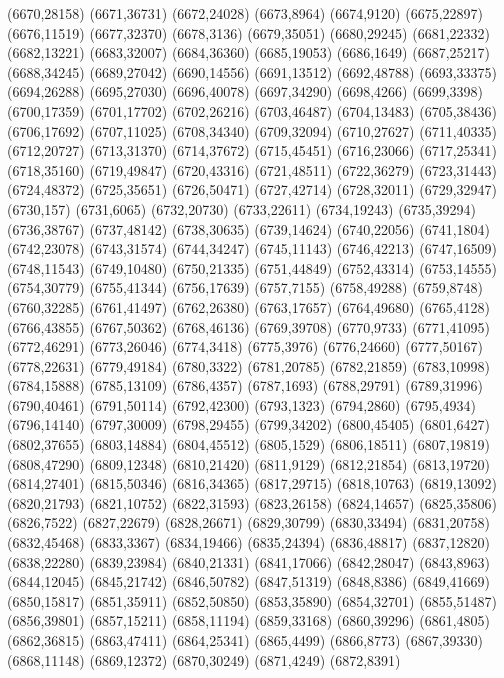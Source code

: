 (6670,28158)
(6671,36731)
(6672,24028)
(6673,8964)
(6674,9120)
(6675,22897)
(6676,11519)
(6677,32370)
(6678,3136)
(6679,35051)
(6680,29245)
(6681,22332)
(6682,13221)
(6683,32007)
(6684,36360)
(6685,19053)
(6686,1649)
(6687,25217)
(6688,34245)
(6689,27042)
(6690,14556)
(6691,13512)
(6692,48788)
(6693,33375)
(6694,26288)
(6695,27030)
(6696,40078)
(6697,34290)
(6698,4266)
(6699,3398)
(6700,17359)
(6701,17702)
(6702,26216)
(6703,46487)
(6704,13483)
(6705,38436)
(6706,17692)
(6707,11025)
(6708,34340)
(6709,32094)
(6710,27627)
(6711,40335)
(6712,20727)
(6713,31370)
(6714,37672)
(6715,45451)
(6716,23066)
(6717,25341)
(6718,35160)
(6719,49847)
(6720,43316)
(6721,48511)
(6722,36279)
(6723,31443)
(6724,48372)
(6725,35651)
(6726,50471)
(6727,42714)
(6728,32011)
(6729,32947)
(6730,157)
(6731,6065)
(6732,20730)
(6733,22611)
(6734,19243)
(6735,39294)
(6736,38767)
(6737,48142)
(6738,30635)
(6739,14624)
(6740,22056)
(6741,1804)
(6742,23078)
(6743,31574)
(6744,34247)
(6745,11143)
(6746,42213)
(6747,16509)
(6748,11543)
(6749,10480)
(6750,21335)
(6751,44849)
(6752,43314)
(6753,14555)
(6754,30779)
(6755,41344)
(6756,17639)
(6757,7155)
(6758,49288)
(6759,8748)
(6760,32285)
(6761,41497)
(6762,26380)
(6763,17657)
(6764,49680)
(6765,4128)
(6766,43855)
(6767,50362)
(6768,46136)
(6769,39708)
(6770,9733)
(6771,41095)
(6772,46291)
(6773,26046)
(6774,3418)
(6775,3976)
(6776,24660)
(6777,50167)
(6778,22631)
(6779,49184)
(6780,3322)
(6781,20785)
(6782,21859)
(6783,10998)
(6784,15888)
(6785,13109)
(6786,4357)
(6787,1693)
(6788,29791)
(6789,31996)
(6790,40461)
(6791,50114)
(6792,42300)
(6793,1323)
(6794,2860)
(6795,4934)
(6796,14140)
(6797,30009)
(6798,29455)
(6799,34202)
(6800,45405)
(6801,6427)
(6802,37655)
(6803,14884)
(6804,45512)
(6805,1529)
(6806,18511)
(6807,19819)
(6808,47290)
(6809,12348)
(6810,21420)
(6811,9129)
(6812,21854)
(6813,19720)
(6814,27401)
(6815,50346)
(6816,34365)
(6817,29715)
(6818,10763)
(6819,13092)
(6820,21793)
(6821,10752)
(6822,31593)
(6823,26158)
(6824,14657)
(6825,35806)
(6826,7522)
(6827,22679)
(6828,26671)
(6829,30799)
(6830,33494)
(6831,20758)
(6832,45468)
(6833,3367)
(6834,19466)
(6835,24394)
(6836,48817)
(6837,12820)
(6838,22280)
(6839,23984)
(6840,21331)
(6841,17066)
(6842,28047)
(6843,8963)
(6844,12045)
(6845,21742)
(6846,50782)
(6847,51319)
(6848,8386)
(6849,41669)
(6850,15817)
(6851,35911)
(6852,50850)
(6853,35890)
(6854,32701)
(6855,51487)
(6856,39801)
(6857,15211)
(6858,11194)
(6859,33168)
(6860,39296)
(6861,4805)
(6862,36815)
(6863,47411)
(6864,25341)
(6865,4499)
(6866,8773)
(6867,39330)
(6868,11148)
(6869,12372)
(6870,30249)
(6871,4249)
(6872,8391)
